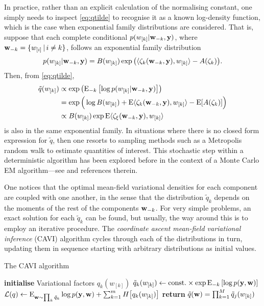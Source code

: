 In practice, rather than an explicit calculation of the normalising constant, one simply needs to inspect \cref{eq:qtilde} to recognise it as a known log-density function, which is the case when exponential family distributions are considered.
That is, suppose that each complete conditional $p(w_{[k]}|{\mathbf w}_{-k}, {\mathbf y})$, where ${\mathbf w}_{-k} = \{w_{[i]} \,|\, i \neq k\}$, follows an exponential family distribution
\[
  p(w_{[k]}| {\mathbf w}_{-k}, {\mathbf y} ) 
  = B(w_{[k]})\exp \big(\langle\zeta_k({\mathbf w}_{-k}, {\mathbf y}) , w_{[k]}\rangle - A(\zeta_k) \big).
\]
Then, from \cref{eq:qtilde},
\begin{align*}
  \tilde q(w_{[k]})
  &\propto \exp \left( \operatorname{E}_{-k} \left[ \log p(w_{[k]}| {\mathbf w}_{-k}, {\mathbf y}) \right] \right) \\
  &= \exp \Big(\log B(w_{[k]}) + \operatorname{E} \langle\zeta_k({\mathbf w}_{-k}, {\mathbf y}) , w_{[k]}\rangle - \operatorname{E} [ A(\zeta_k) ] \Big) \\
  &\propto B(w_{[k]})\exp \operatorname{E}\langle\zeta_\xi({\mathbf w}_{-k}, {\mathbf y}) , w_{[k]}\rangle
\end{align*}
is also in the same exponential family.
In situations where there is no closed form expression for $\tilde q$, then one resorts to sampling methods such as a Metropolis random walk to estimate quantities of interest.
This stochastic step within a deterministic algorithm has been explored before in the context of a Monte Carlo EM algorithm---see \citet[sec. 4, pp. 537--538]{meng1997algorithm} and references therein.

One notices that the optimal mean-field variational densities for each component are coupled with one another, in the sense that the distribution $\tilde q_k$ depends on the moments of the rest of the components ${\mathbf w}_{-k}$.
For very simple problems, an exact solution for each $\tilde q_k$ can be found, but usually, the way around this is to employ an iterative procedure.
The \emph{coordinate ascent mean-field variational inference} (CAVI) algorithm cycles through each of the distributions in turn, updating them in sequence starting with arbitrary distributions as initial values.

\begin{algorithm}[H]
\caption{The CAVI algorithm}\label{alg:cavi}
  \begin{algorithmic}[1]
    \State \textbf{initialise} Variational factors $q_k(w_{[k]})$
        \State $\tilde q_k(w_{[k]}) \gets \text{const.}\hspace{0.01em} \times \exp \operatorname{E}_{-k}\left[ \log p({\mathbf y},{\mathbf w}) \right]$ 
      \EndFor
      \State ${\mathcal L}(q) \gets \operatorname{E}_{{\mathbf w} \sim \prod_k\tilde q_k}\log p({\mathbf y}, {\mathbf w}) + \sum_{k=1}^m H\big[ q_k(w_{[k]})\big]$ 
    \EndWhile
    \State \textbf{return} $\tilde q({\mathbf w}) = \prod_{k=1}^M \tilde q_j(w_{[k]})$ 
  \end{algorithmic}
\end{algorithm}

